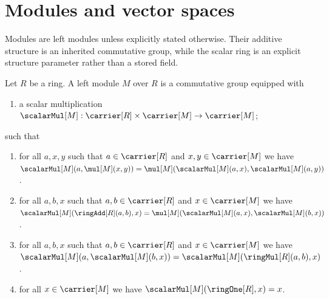 






\section{Modules and vector spaces}

Modules are left modules unless explicitly stated otherwise. Their additive
structure is an inherited commutative group, while the scalar ring is an
explicit structure parameter rather than a stored field.

\begin{struct}\label{left_module}
    Let $R$ be a ring.
    A left module $M$ over $R$ is a commutative group equipped with
    \begin{enumerate}
        \item\label{module_scalar_graph}
            a scalar multiplication
            $\scalarMul[M]:
                \carrier[R]\times\carrier[M]\to\carrier[M]$;
    \end{enumerate}
    such that
    \begin{enumerate}
        \item\label{module_scalar_vector_distributive}
            for all $a,x,y$ such that
                $a\in\carrier[R]$ and
                $x,y\in\carrier[M]$ we have
                $\scalarMul[M](a,\mul[M](x,y))
                    =\mul[M]
                        (\scalarMul[M](a,x),\scalarMul[M](a,y))$.
        \item\label{module_scalar_add_distributive}
            for all $a,b,x$ such that
                $a,b\in\carrier[R]$ and
                $x\in\carrier[M]$ we have
                $\scalarMul[M](\ringAdd[R](a,b),x)
                    =\mul[M]
                        (\scalarMul[M](a,x),\scalarMul[M](b,x))$.
        \item\label{module_scalar_associative}
            for all $a,b,x$ such that
                $a,b\in\carrier[R]$ and
                $x\in\carrier[M]$ we have
                $\scalarMul[M]
                    (a,\scalarMul[M](b,x))
                    =\scalarMul[M]
                        (\ringMul[R](a,b),x)$.
        \item\label{module_scalar_one}
            for all $x\in\carrier[M]$ we have
                $\scalarMul[M](\ringOne[R],x)=x$.
    \end{enumerate}
\end{struct}

